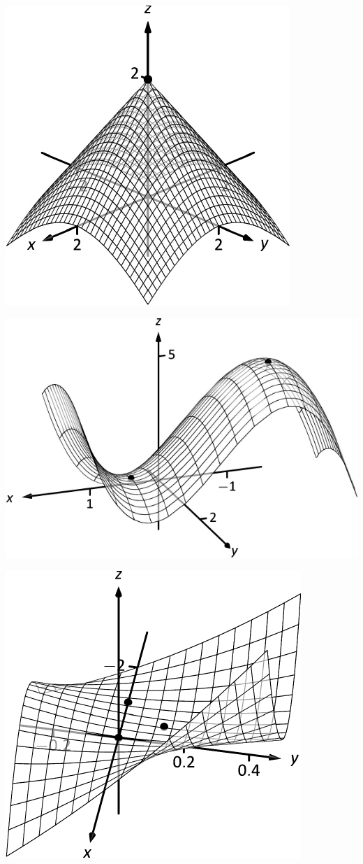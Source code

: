 \documentclass[10pt]{article}
\begin{document}
\includegraphics{figmulti_extreme2_3DBW.pdf}
\texttt{}

\includegraphics{figmulti_extreme3_3DBW.pdf}
\texttt{}

\includegraphics{figmulti_extreme5_3DBW.pdf}
\texttt{}
\end{document}
